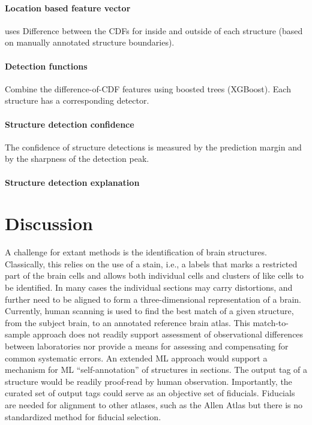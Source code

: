 \documentclass[11pt]{article}
\begin{document}
\paragraph{Location based feature vector} uses Difference between the CDFs for inside and outside of each structure (based on manually annotated structure boundaries). 
\paragraph{Detection functions} Combine the difference-of-CDF
features using boosted trees (XGBoost). Each structure has a
corresponding detector.

\paragraph{Structure detection confidence} The confidence of structure
  detections is measured by the prediction margin and by the sharpness
  of the detection peak.

\paragraph{ Structure detection explanation}

\section{Discussion}

A challenge for extant methods is the
identification of brain structures. Classically, this relies on the
use of a stain, i.e., a labels that marks a restricted part of the
brain cells and allows both individual cells and clusters of like
cells to be identified. In many cases the individual sections may
carry distortions, and further need to be aligned to form a
three-dimensional representation of a brain. Currently, human scanning
is used to find the best match of a given structure, from the subject
brain, to an annotated reference brain atlas. This match-to-sample
approach does not readily support assessment of observational
differences between laboratories nor provide a means for assessing and
compensating for common systematic errors. An extended ML approach
would support a mechanism for ML “self-annotation” of structures in
sections. The output tag of a structure would be readily proof-read by
human observation. Importantly, the curated set of output tags could
serve as an objective set of fiducials. Fiducials are needed for
alignment to other atlases, such as the Allen Atlas but there is no
standardized method for fiducial selection.
\end{document}
